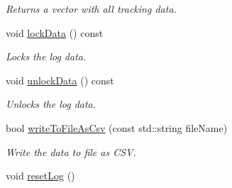 \begin{DoxyCompactItemize}
\begin{DoxyCompactList}\small\item\em Returns a vector with all tracking data. \end{DoxyCompactList}\item 
void \hyperlink{class_vision_core_1_1_abstractions_1_1_tracker_logger_a50968bdeed09c7b26cb46c839fe55a52}{lock\+Data} () const 
\begin{DoxyCompactList}\small\item\em Locks the log data. \end{DoxyCompactList}\item 
\hypertarget{class_vision_core_1_1_abstractions_1_1_tracker_logger_a59ce319514ddd7916f8962e25cc85869}{}void \hyperlink{class_vision_core_1_1_abstractions_1_1_tracker_logger_a59ce319514ddd7916f8962e25cc85869}{unlock\+Data} () const \label{class_vision_core_1_1_abstractions_1_1_tracker_logger_a59ce319514ddd7916f8962e25cc85869}

\begin{DoxyCompactList}\small\item\em Unlocks the log data. \end{DoxyCompactList}\item 
\hypertarget{class_vision_core_1_1_abstractions_1_1_tracker_logger_a7a25babdd801ae1a4d4365a70af3032d}{}bool \hyperlink{class_vision_core_1_1_abstractions_1_1_tracker_logger_a7a25babdd801ae1a4d4365a70af3032d}{write\+To\+File\+As\+Csv} (const std\+::string file\+Name)\label{class_vision_core_1_1_abstractions_1_1_tracker_logger_a7a25babdd801ae1a4d4365a70af3032d}

\begin{DoxyCompactList}\small\item\em Write the data to file as C\+S\+V. \end{DoxyCompactList}\item 
\hypertarget{class_vision_core_1_1_abstractions_1_1_tracker_logger_a0f269bca8139be827d8f673bed676f60}{}void \hyperlink{class_vision_core_1_1_abstractions_1_1_tracker_logger_a0f269bca8139be827d8f673bed676f60}{reset\+Log} ()\label{class_vision_core_1_1_abstractions_1_1_tracker_logger_a0f269bca8139be827d8f673bed676f60}


\end{DoxyCompactItemize}
